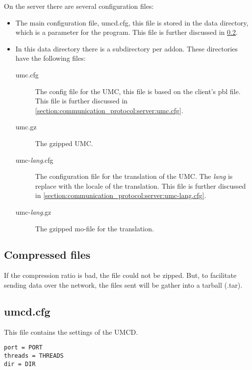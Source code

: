 On the server there are several configuration files:
\begin{itemize}
\item
	The main configuration file, umcd.cfg, this file is stored in the
	data directory, which is a parameter for the program. This file is
	further discussed in \cref{section:communication_protocol:server:umcd.cfg}.

\item
	In this data directory there is a subdirectory per addon. These
	directories have the following files:
	\begin{description}
	\item[umc.cfg]
		The config file for the UMC, this file is based on the client's
		pbl file. This file is further discussed in
		\cref{section:communication_protocol:server:umc.cfg}.

	\item[umc.gz]
		The gzipped UMC.

	\item[umc-\emph{lang}.cfg]
		The configuration file for the translation of the UMC. The
		\emph{lang} is replace with the locale of the translation.
		This file is further discussed in
		\cref{section:communication_protocol:server:umc-lang.cfg}.

	\item[umc-\emph{lang}.gz]
		The gzipped mo-file for the translation.

	\end{description}

\end{itemize}

\subsection{Compressed files}

If the compression ratio is bad, the file could not be zipped. But, to facilitate
sending data over the network, the files sent will be gather into a tarball (.tar).

\subsection{umcd.cfg}
\label{section:communication_protocol:server:umcd.cfg}

This file contains the settings of the UMCD.

\begin{lstlisting}
port = PORT
threads = THREADS
dir = DIR
\end{lstlisting}

